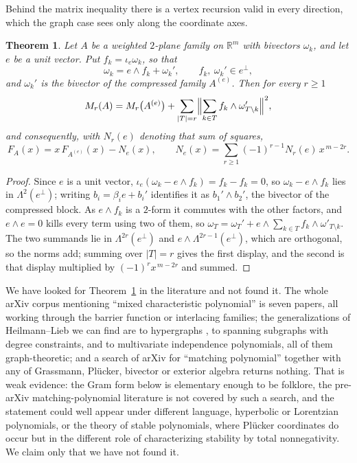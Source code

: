 \documentclass[11pt]{article}
\newtheorem{theorem}{Theorem}
\theoremstyle{remark}
\begin{document}
Behind the matrix inequality there is a vertex recursion valid in every direction,
which the graph case sees only along the coordinate axes.

\begin{theorem}\label{thm:vertexrec}
Let $A$ be a weighted $2$-plane family on $\mathbb R^m$ with bivectors $\omega_k$,
and let $e$ be a unit vector. Put $f_k=\iota_e\omega_k$, so that
\[
\omega_k=e\wedge f_k+\omega_k',\qquad
f_k,\ \omega_k'\in e^\perp ,
\]
and $\omega_k'$ is the bivector of the compressed family $A^{(e)}$. Then for every
$r\ge1$
\[
M_r(A)=M_r\bigl(A^{(e)}\bigr)
+\sum_{|T|=r}\Bigl\|\sum_{k\in T}f_k\wedge\omega'_{T\setminus k}\Bigr\|^2 ,
\]
and consequently, with $N_r(e)$ denoting that sum of squares,
\[
F_A(x)=x\,F_{A^{(e)}}(x)-N_e(x),\qquad
N_e(x)=\sum_{r\ge1}(-1)^{r-1}N_r(e)\,x^{\,m-2r}.
\]
\end{theorem}

\begin{proof}
Since $e$ is a unit vector, $\iota_e(\omega_k-e\wedge f_k)=f_k-f_k=0$, so
$\omega_k-e\wedge f_k$ lies in $\Lambda^2(e^\perp)$; writing $b_i=\beta_ie+b_i'$
identifies it as $b_1'\wedge b_2'$, the bivector of the compressed block. As
$e\wedge f_k$ is a $2$-form it commutes with the other factors, and $e\wedge e=0$
kills every term using two of them, so
$\omega_T=\omega_T'+e\wedge\sum_{k\in T}f_k\wedge\omega'_{T\setminus k}$. The two
summands lie in $\Lambda^{2r}(e^\perp)$ and $e\wedge\Lambda^{2r-1}(e^\perp)$, which
are orthogonal, so the norms add; summing over $|T|=r$ gives the first display, and
the second is that display multiplied by $(-1)^rx^{\,m-2r}$ and summed.
\end{proof}

We have looked for Theorem~\ref{thm:vertexrec} in the literature and not found it. The
whole arXiv corpus mentioning ``mixed characteristic polynomial'' is seven papers, all
working through the barrier function or interlacing families; the generalizations of
Heilmann--Lieb we can find are to hypergraphs \cite{Zhang}, to spanning subgraphs with
degree constraints, and to multivariate independence polynomials, all of them
graph-theoretic; and a search of arXiv for ``matching polynomial'' together with any of
Grassmann, Pl\"ucker, bivector or exterior algebra returns nothing. That is weak evidence:
the Gram form below is elementary enough to be folklore, the pre-arXiv matching-polynomial
literature is not covered by such a search, and the statement could well appear under
different language, hyperbolic or Lorentzian polynomials, or the theory of stable
polynomials, where Pl\"ucker coordinates do occur but in the different role of
characterizing stability by total nonnegativity. We claim only that we have not found it.
\end{document}
